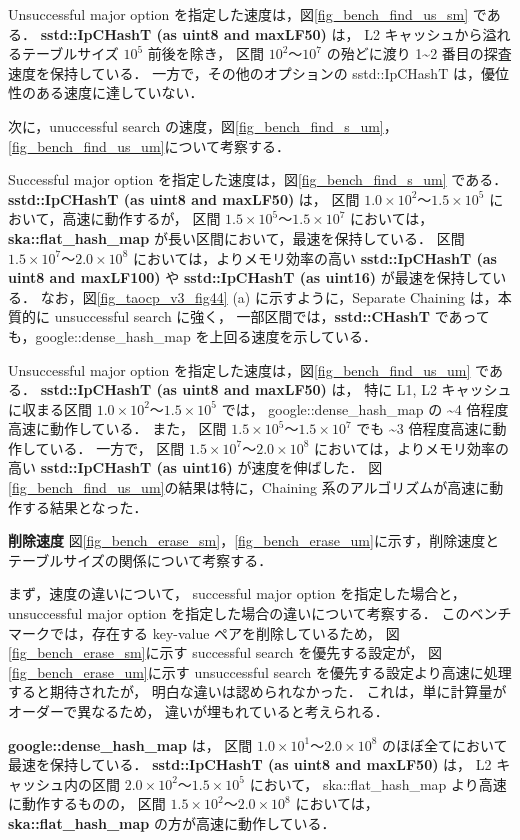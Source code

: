 Unsuccessful major option を指定した速度は，図\ref{fig_bench_find_us_sm} である．
{\bf sstd::IpCHashT (as uint8 and maxLF50)} は，
L2 キャッシュから溢れるテーブルサイズ $10^5$ 前後を除き，
区間 $10^2〜10^7$ の殆どに渡り 1\textasciitilde 2 番目の探査速度を保持している．
一方で，その他のオプションの sstd::IpCHashT は，優位性のある速度に達していない．

次に，unuccessful search の速度，図\ref{fig_bench_find_s_um}，\ref{fig_bench_find_us_um}について考察する．

Successful major option を指定した速度は，図\ref{fig_bench_find_s_um} である．
{\bf sstd::IpCHashT (as uint8 and maxLF50)} は，
区間 $1.0\times10^2〜1.5\times10^5$ において，高速に動作するが，
区間 $1.5\times10^5〜1.5\times10^7$ においては，{\bf ska::flat\_hash\_map} が長い区間において，最速を保持している．
区間 $1.5\times10^7〜2.0\times10^8$ においては，よりメモリ効率の高い
{\bf sstd::IpCHashT (as uint8 and maxLF100)} や {\bf sstd::IpCHashT (as uint16)} が最速を保持している．
なお，図\ref{fig_taocp_v3_fig44} (a) に示すように，Separate Chaining は，本質的に unsuccessful search に強く，
一部区間では，{\bf sstd::CHashT} であっても，google::dense\_hash\_map を上回る速度を示している．

Unsuccessful major option を指定した速度は，図\ref{fig_bench_find_us_um} である．
{\bf sstd::IpCHashT (as uint8 and maxLF50)} は，
特に L1, L2 キャッシュに収まる区間 $1.0\times10^2〜1.5\times10^5$ では，
google::dense\_hash\_map の \textasciitilde4 倍程度高速に動作している．
また，
区間 $1.5\times10^5〜1.5\times10^7$ でも \textasciitilde3 倍程度高速に動作している．
一方で，
区間 $1.5\times10^7〜2.0\times10^8$ においては，よりメモリ効率の高い {\bf sstd::IpCHashT (as uint16)} が速度を伸ばした．
図\ref{fig_bench_find_us_um}の結果は特に，Chaining 系のアルゴリズムが高速に動作する結果となった．
\leavevmode \newline

%
{\bf 削除速度}
\samepage\newline\indent
図\ref{fig_bench_erase_sm}，\ref{fig_bench_erase_um}に示す，削除速度とテーブルサイズの関係について考察する．

まず，速度の違いについて，
successful major option を指定した場合と，
unsuccessful major option を指定した場合の違いについて考察する．
このベンチマークでは，存在する key-value ペアを削除しているため，
図\ref{fig_bench_erase_sm}に示す successful search を優先する設定が，
図\ref{fig_bench_erase_um}に示す unsuccessful search を優先する設定より高速に処理すると期待されたが，
明白な違いは認められなかった．
これは，単に計算量がオーダーで異なるため，
違いが埋もれていると考えられる．

{\bf google::dense\_hash\_map} は，
区間 $1.0\times10^1〜2.0\times10^8$ のほぼ全てにおいて最速を保持している．
{\bf sstd::IpCHashT (as uint8 and maxLF50)} は，
L2 キャッシュ内の区間 $2.0\times10^2〜1.5\times10^5$ において，
ska::flat\_hash\_map より高速に動作するものの，
区間 $1.5\times10^2〜2.0\times10^8$ においては，
{\bf ska::flat\_hash\_map} の方が高速に動作している．


